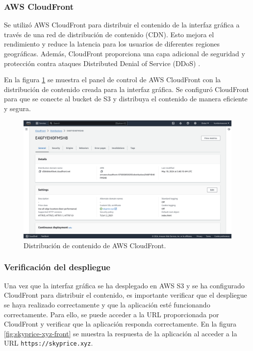 \subsubsection{AWS CloudFront}
Se utilizó AWS CloudFront para distribuir el contenido de la interfaz gráfica a
través de una red de distribución de contenido (CDN). Esto mejora el rendimiento
y reduce la latencia para los usuarios de diferentes regiones geográficas. Además,
CloudFront proporciona una capa adicional de seguridad y protección contra ataques
Distributed Denial of Service (DDoS) \cite{aws_cloudfront_intro}.

En la figura \ref{fig:cloudfront} se muestra el panel de control de AWS CloudFront
con la distribución de contenido creada para la interfaz gráfica. Se configuró
CloudFront para que se conecte al bucket de S3 y distribuya el contenido de manera
eficiente y segura.

\begin{figure}[H]
    \centering
    \includegraphics[width=1.0\textwidth]{imagenes/05-implementacion/despliegue/aws-cloudfront.png}
    \caption{Distribución de contenido de AWS CloudFront.}
    \label{fig:cloudfront}
\end{figure}

\subsubsection{Verificación del despliegue}
Una vez que la interfaz gráfica se ha desplegado en AWS S3 y se ha configurado
CloudFront para distribuir el contenido, es importante verificar que el despliegue
se haya realizado correctamente y que la aplicación esté funcionando correctamente.
Para ello, se puede acceder a la URL proporcionada por CloudFront y verificar que
la aplicación responda correctamente. En la figura \ref{fig:skyprice-xyz-front} se
muestra la respuesta de la aplicación al acceder a la URL \texttt{https://skyprice.xyz}.

